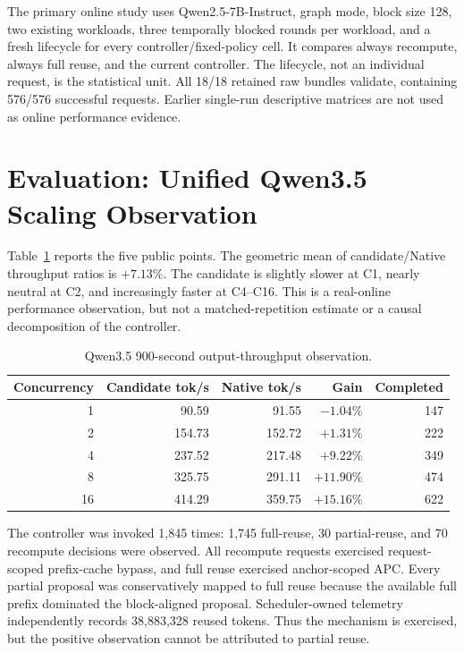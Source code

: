 \documentclass[conference]{IEEEtran}
\begin{document}
The primary online study uses Qwen2.5-7B-Instruct, graph mode, block size 128,
two existing workloads, three temporally blocked rounds per workload, and a
fresh lifecycle for every controller/fixed-policy cell. It compares always
recompute, always full reuse, and the current controller. The lifecycle, not an
individual request, is the statistical unit. All 18/18 retained raw bundles
validate, containing 576/576 successful requests. Earlier single-run
descriptive matrices are not used as online performance evidence.

\section{Evaluation: Unified Qwen3.5 Scaling Observation}
Table~\ref{tab:qwen35} reports the five public points. The geometric mean of
candidate/Native throughput ratios is $+7.13\%$. The candidate is slightly
slower at C1, nearly neutral at C2, and increasingly faster at C4--C16. This is
a real-online performance observation, but not a matched-repetition estimate or
a causal decomposition of the controller.

\begin{table}[t]
\centering
\caption{Qwen3.5 900-second output-throughput observation.}
\label{tab:qwen35}
\scriptsize
\begin{tabular}{rrrrr}
\toprule
Concurrency & Candidate tok/s & Native tok/s & Gain & Completed \\
\midrule
1  & 90.59  & 91.55  & $-1.04\%$ & 147 \\
2  & 154.73 & 152.72 & $+1.31\%$ & 222 \\
4  & 237.52 & 217.48 & $+9.22\%$ & 349 \\
8  & 325.75 & 291.11 & $+11.90\%$ & 474 \\
16 & 414.29 & 359.75 & $+15.16\%$ & 622 \\
\bottomrule
\end{tabular}
\end{table}

The controller was invoked 1,845 times: 1,745 full-reuse, 30 partial-reuse, and
70 recompute decisions were observed. All recompute requests exercised
request-scoped prefix-cache bypass, and full reuse exercised anchor-scoped APC.
Every partial proposal was conservatively mapped to full reuse because the
available full prefix dominated the block-aligned proposal. Scheduler-owned
telemetry independently records 38,883,328 reused tokens. Thus the mechanism is
exercised, but the positive observation cannot be attributed to partial reuse.
\end{document}
